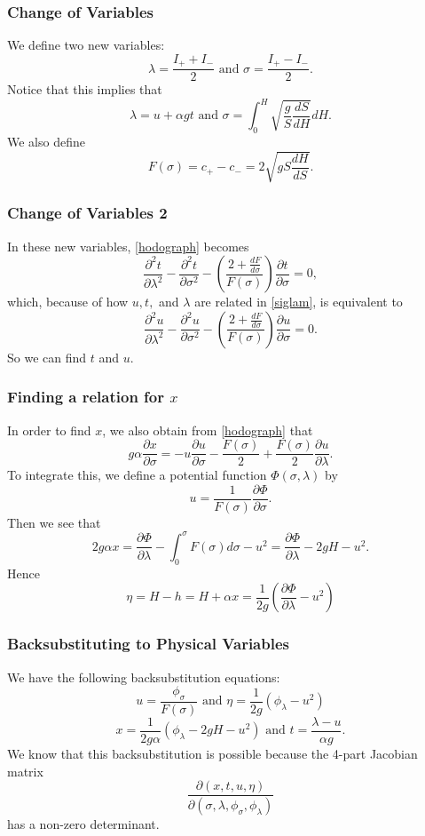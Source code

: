 \begin{frame}
\frametitle{Change of Variables}
We define two new variables:
\[
\lambda = \frac{I_+ + I_-}{2} \text{ and } \sigma = \frac{I_+ - I_-}{2}.
\]
Notice that this implies that
\begin{equation} \label{siglam}
\lambda = u + \alpha g t \text{ and } \sigma = \int_0^H \sqrt{\frac{g}{S} \frac{dS}{dH}}dH.
\end{equation}
We also define
\[
F(\sigma) = c_+ - c_- = 2 \sqrt{gS \frac{dH}{dS}}.
\]
\end{frame}

\begin{frame}
\frametitle{Change of Variables 2}
In these new variables, \eqref{hodograph} becomes
\[
\frac{\partial^2 t}{\partial \lambda^2} - \frac{\partial^2 t}{\partial \sigma^2} - \left( \frac{2 + \frac{dF}{d\sigma}}{F(\sigma)} \right) \frac{\partial t}{\partial \sigma} = 0,
\]
which, because of how $u,t,$ and $\lambda$ are related in \eqref{siglam}, is equivalent to
\begin{equation}\label{finalu}
\frac{\partial^2 u}{\partial \lambda^2} - \frac{\partial^2 u}{\partial \sigma^2} - \left( \frac{2 + \frac{dF}{d\sigma}}{F(\sigma)} \right) \frac{\partial u}{\partial \sigma} = 0.
\end{equation}
So we can find $t$ and $u$.
\end{frame}

\begin{frame}
\frametitle{Finding a relation for $x$}
In order to find $x$, we also obtain from \eqref{hodograph} that
\[
g \alpha \frac{\partial x}{\partial \sigma} = - u \frac{\partial u}{\partial \sigma} - \frac{F(\sigma)}{2} + \frac{F(\sigma)}{2} \frac{\partial u}{\partial \lambda}.
\]
To integrate this, we define a potential function $\Phi(\sigma,\lambda)$ by
\[
u = \frac{1}{F(\sigma)} \frac{\partial \Phi}{\partial \sigma}.
\]
Then we see that
\[
2 g \alpha x = \frac{\partial \Phi}{\partial \lambda} - \int_0^\sigma F(\sigma) d\sigma - u^2 = \frac{\partial \Phi}{\partial \lambda} - 2gH - u^2.
\]
Hence
\[
\eta = H - h = H + \alpha x = \frac{1}{2g} \left(\frac{\partial \Phi}{\partial \lambda} - u^2 \right)
\]
\end{frame}








\begin{frame}
\frametitle{Backsubstituting to Physical Variables}
We have the following backsubstitution equations:
\[
u = \frac{\phi_\sigma}{F(\sigma)} \text{ and } \eta = \frac{1}{2g}\left(\phi_\lambda - u^2\right)
\]
\[
x = \frac{1}{2g\alpha} \left(\phi_\lambda - 2gH - u^2 \right) \text{ and } t = \frac{\lambda - u}{\alpha g}.
\]
We know that this backsubstitution is possible because the 4-part Jacobian matrix
\[
\frac{\partial (x,t,u,\eta)}{\partial (\sigma,\lambda,\phi_\sigma,\phi_\lambda)}
\]
has a non-zero determinant.
\end{frame}


